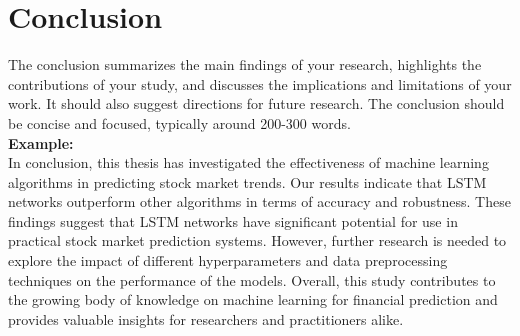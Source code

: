 \documentclass[openany]{book}
\numberwithin{figure}{chapter}
\numberwithin{equation}{chapter}
\begin{document}
\chapter{Conclusion}
The conclusion summarizes the main findings of your research, highlights the contributions of your study, and discusses the implications and limitations of your work. It should also suggest directions for future research. The conclusion should be concise and focused, typically around 200-300 words.\\

{\bf Example:}\\

In conclusion, this thesis has investigated the effectiveness of machine learning algorithms in predicting stock market trends. Our results indicate that LSTM networks outperform other algorithms in terms of accuracy and robustness. These findings suggest that LSTM networks have significant potential for use in practical stock market prediction systems. However, further research is needed to explore the impact of different hyperparameters and data preprocessing techniques on the performance of the models. Overall, this study contributes to the growing body of knowledge on machine learning for financial prediction and provides valuable insights for researchers and practitioners alike.\\


\newpage
{}

\end{document}
